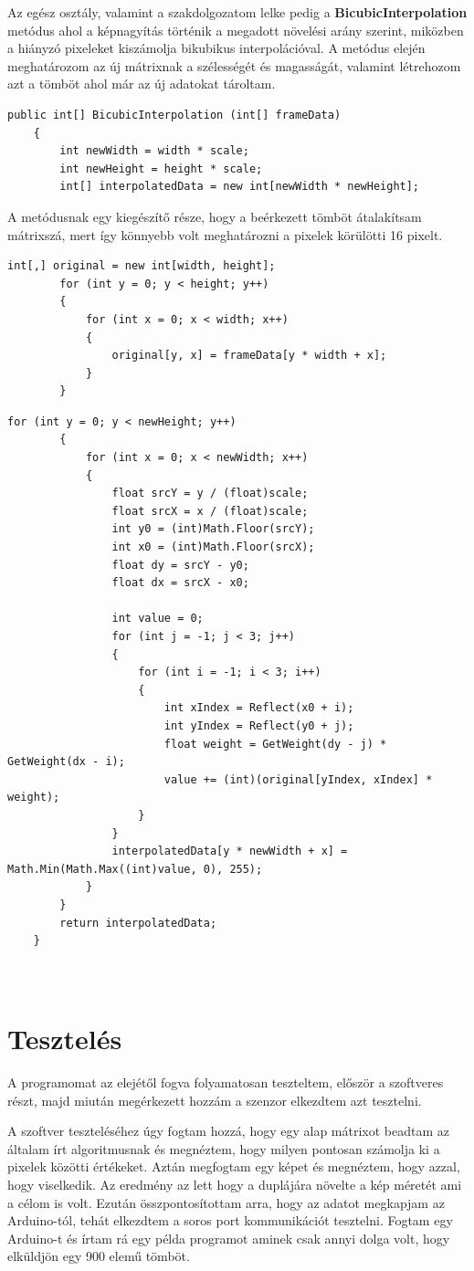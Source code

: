 \documentclass[]{thesis-ekf}
\theoremstyle{definition}
\theoremstyle{remark}
\begin{document}
Az egész osztály, valamint a szakdolgozatom lelke pedig a \textbf{BicubicInterpolation} metódus ahol a képnagyítás történik a megadott növelési arány szerint, miközben a hiányzó pixeleket kiszámolja bikubikus interpolációval. A metódus elején meghatározom az új mátrixnak a szélességét és magasságát, valamint létrehozom azt a tömböt ahol már az új adatokat tároltam.
\begin{lstlisting}[language=CSharp]
	public int[] BicubicInterpolation (int[] frameData)
	{
		int newWidth = width * scale;
		int newHeight = height * scale;
		int[] interpolatedData = new int[newWidth * newHeight];
\end{lstlisting}
A metódusnak egy kiegészítő része, hogy a beérkezett tömböt átalakítsam mátrixszá, mert így könnyebb volt meghatározni a pixelek körülötti 16 pixelt. 
\begin{lstlisting}[language=CSharp]
		int[,] original = new int[width, height];
		for (int y = 0; y < height; y++)
		{
			for (int x = 0; x < width; x++)
			{
				original[y, x] = frameData[y * width + x];
			}
		}
\end{lstlisting}

\begin{lstlisting}[language=CSharp]
		for (int y = 0; y < newHeight; y++)
		{
			for (int x = 0; x < newWidth; x++)
			{
				float srcY = y / (float)scale;
				float srcX = x / (float)scale;
				int y0 = (int)Math.Floor(srcY);
				int x0 = (int)Math.Floor(srcX);
				float dy = srcY - y0;
				float dx = srcX - x0;
				
				int value = 0;
				for (int j = -1; j < 3; j++)
				{
					for (int i = -1; i < 3; i++)
					{
						int xIndex = Reflect(x0 + i);
						int yIndex = Reflect(y0 + j);
						float weight = GetWeight(dy - j) * GetWeight(dx - i);
						value += (int)(original[yIndex, xIndex] * weight);
					}
				}
				interpolatedData[y * newWidth + x] = Math.Min(Math.Max((int)value, 0), 255);
			}
		}
		return interpolatedData;
	}
	
	
\end{lstlisting}
\chapter{Tesztelés}
A programomat az elejétől fogva folyamatosan teszteltem, először a szoftveres részt, majd miután megérkezett hozzám a szenzor elkezdtem azt tesztelni. 

A szoftver teszteléséhez úgy fogtam hozzá, hogy egy alap mátrixot beadtam az általam írt algoritmusnak és megnéztem, hogy milyen pontosan számolja ki a pixelek közötti értékeket. Aztán megfogtam egy képet és megnéztem, hogy azzal, hogy viselkedik. Az eredmény az lett hogy a duplájára növelte a kép méretét ami a célom is volt. Ezután összpontosítottam arra, hogy az adatot megkapjam az Arduino-tól, tehát elkezdtem a soros port kommunikációt tesztelni. Fogtam egy Arduino-t és írtam rá egy példa programot aminek csak annyi dolga volt, hogy elküldjön egy 900 elemű tömböt.
\end{document}
